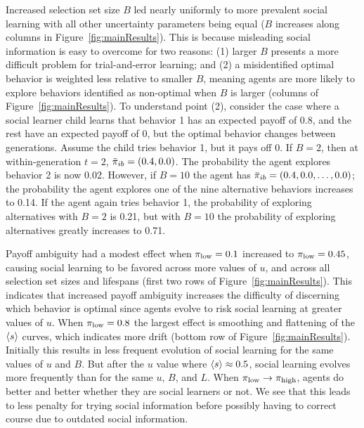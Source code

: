 \documentclass[letterpaper,11.5pt]{scrartcl}
\begin{document}
Increased selection set size $B$ led nearly uniformly to more prevalent social
learning with all other uncertainty parameters being equal ($B$ increases along
columns in Figure~\ref{fig:mainResults}).  This is because misleading social
information is easy to overcome for two reasons: (1) larger $B$ presents a more
difficult problem for trial-and-error learning; and (2) a misidentified optimal
behavior is weighted less relative to smaller $B$, meaning agents are more likely to
explore behaviors identified as non-optimal when $B$ is larger (columns of
Figure~\ref{fig:mainResults}).  
To understand point (2), consider the case where a social learner child learns
that behavior 1 has an expected payoff of 0.8, and the rest have an expected
payoff of 0, but the optimal behavior changes between generations. Assume
the child tries behavior 1, but it pays off 0.
If $B=2$, then at within-generation $t=2$, $\bar\pi_{ib} = (0.4, 0.0)$. The probability
the agent explores behavior 2 is now 0.02. However, if $B=10$ the agent has
$\bar\pi_{ib} = (0.4, 0.0, \ldots, 0.0)$; the probability
the agent explores one of the nine alternative behaviors increases to 0.14.
If the agent again tries behavior 1, the probability of exploring alternatives
with $B=2$ is 0.21, but with $B=10$ the probability of exploring alternatives
greatly increases to 0.71.

Payoff ambiguity had a modest effect when $\pi_{\mathrm{low}} = 0.1$ increased to $\pi_{\mathrm{low}} =
0.45$, causing social learning to be favored across more values of $u$, and across
all selection set sizes and lifespans (first two rows of
Figure~\ref{fig:mainResults}).  This indicates that increased payoff ambiguity
increases the difficulty of discerning which behavior is optimal since agents evolve
to risk social learning at greater values of $u$.  When $\pi_{\mathrm{low}} = 0.8$ the largest
effect is smoothing and flattening of the $\langle s \rangle$ curves, which indicates more
drift (bottom row of Figure~\ref{fig:mainResults}).  Initially this results in less
frequent evolution of social learning for the same values of $u$ and $B$. But after
the $u$ value where $\langle s \rangle \approx 0.5$, social learning evolves more frequently
than for the same $u$, $B$, and $L$. When $\pi_{\mathrm{low}} \to \pi_{\mathrm{high}}$, agents do better and
better whether they are social learners or not. We see that this leads to less
penalty for trying social information before possibly having to correct course due
to outdated social information.
\end{document}
